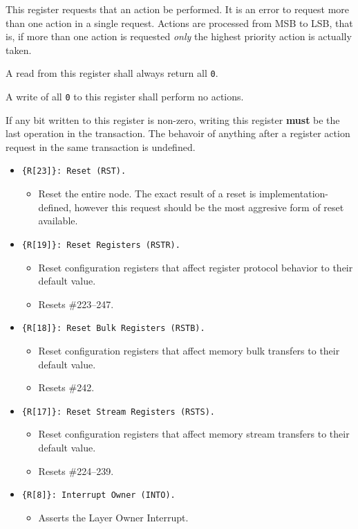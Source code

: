 This register requests that an action be performed. It is an error to request
more than one action in a single request. Actions are processed from MSB to
LSB, that is, if more than one action is requested {\em only} the highest
priority action is actually taken.

A read from this register shall always return all {\tt 0}.

A write of all {\tt 0} to this register shall perform no actions.

If any bit written to this register is non-zero, writing this register {\bf
must} be the last operation in the transaction. The behavoir of anything after
a register action request in the same transaction is undefined.

\begin{itemize}
  \item \texttt{\{R[23]\}: Reset (RST).}
    \begin{itemize}
      \item Reset the entire node. The exact result of a reset is
        implementation-defined, however this request should be the most
        aggresive form of reset available.
    \end{itemize}
  \item \texttt{\{R[19]\}: Reset \proto Registers (RSTR).}
    \begin{itemize}
      \item Reset \proto configuration registers that affect register protocol
        behavior to their default value.
      \item Resets \#223--247.
    \end{itemize}
  \item \texttt{\{R[18]\}: Reset Bulk Registers (RSTB).}
    \begin{itemize}
      \item Reset \proto configuration registers that affect memory bulk
        transfers to their default value.
      \item Resets \#242.
    \end{itemize}
  \item \texttt{\{R[17]\}: Reset Stream Registers (RSTS).}
    \begin{itemize}
      \item Reset \proto configuration registers that affect memory stream
        transfers to their default value.
      \item Resets \#224--239.
    \end{itemize}
  \item \texttt{\{R[8]\}: Interrupt Owner (INTO).}
    \begin{itemize}
      \item Asserts the Layer Owner Interrupt.
    \end{itemize}
\end{itemize}



